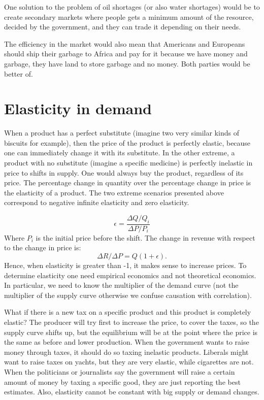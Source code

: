 One solution to the problem of oil shortages (or also water shortages) would be to create secondary markets where people gets a minimum amount of the resource, decided by the government, and they can trade it depending on their needs.

The efficiency in the market would also mean that Americans and Europeans should ship their garbage to Africa and pay for it because we have money and garbage, they have land to store garbage and no money. Both parties would be better of.

\section{Elasticity in demand}

When a product has a perfect substitute (imagine two very similar kinds of biscuits for example), then the price of the product is perfectly elastic, because one can immediately change it with its substitute. In the other extreme, a product with no substitute (imagine a specific medicine) is perfectly inelastic in price to shifts in supply. One would always buy the product, regardless of its price. The percentage change in quantity over the percentage change in price is the elasticity of a product. The two extreme scenarios presented above correspond to negative infinite elasticity and zero elasticity.

\begin{equation}
    \epsilon = \dfrac{\Delta Q/ Q_i}{\Delta P/ P_i}
\end{equation}
Where $P_i$ is the initial price before the shift.
The change in revenue with respect to the change in price is:
\begin{equation}
    \Delta R / \Delta P = Q (1 + \epsilon).
\end{equation}
Hence, when elasticity is greater than -1, it makes sense to increase prices. To determine elasticity one need empirical economics and not theoretical economics. In particular, we need to know the multiplier of the demand curve (not the multiplier of the supply curve otherwise we confuse causation with correlation).

What if there is a new tax on a specific product and this product is completely elastic? The producer will try first to increase the price, to cover the taxes, so the supply curve shifts up, but the equilibrium will be at the point where the price is the same as before and lower production. When the government wants to raise money through taxes, it should do so taxing inelastic products. Liberals might want to raise taxes on yachts, but they are very elastic, while cigarettes are not. When the politicians or journalists say the government will raise a certain amount of money by taxing a specific good, they are just reporting the best estimates. Also, elasticity cannot be constant with big supply or demand changes.


